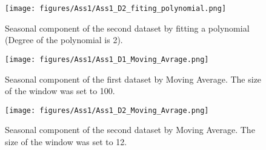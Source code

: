 \begin{figure}[H]
    \centering
    \begin{minipage}[b]{1\textwidth}
        \texttt{[image: figures/Ass1/Ass1\_D2\_fiting\_polynomial.png]}
    \end{minipage}
    \caption{Seasonal component of the second dataset by fitting a polynomial (Degree of the polynomial is 2).}
    \label{fig:Ass1_D2_fiting_polynomial}
\end{figure}

\begin{figure}[H]
    \centering
    \begin{minipage}[b]{1\textwidth}
        \texttt{[image: figures/Ass1/Ass1\_D1\_Moving\_Avrage.png]}
    \end{minipage}
    \caption{Seasonal component of the first dataset by Moving Average. The size of the window was set to 100.}
    \label{fig:Ass1_D1_Moving_Avrage}
\end{figure}

\begin{figure}[H]
    \centering
    \begin{minipage}[b]{1\textwidth}
        \texttt{[image: figures/Ass1/Ass1\_D2\_Moving\_Avrage.png]}
    \end{minipage}
    \caption{Seasonal component of the second dataset by Moving Average. The size of the window was set to 12.  }
    \label{fig:Ass1_D2_Moving_Avrage}
\end{figure}



